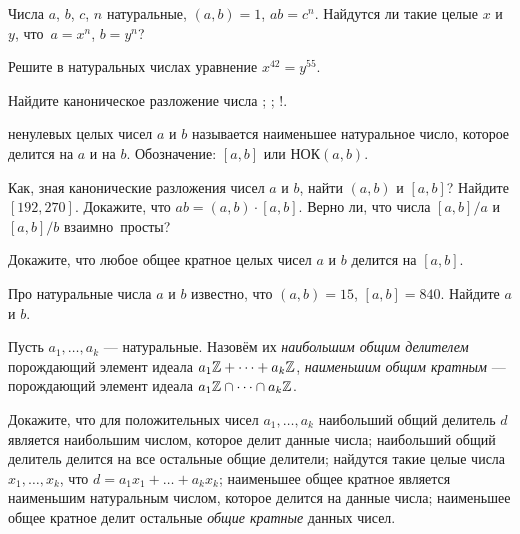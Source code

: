 \documentclass[a4paper,11pt]{article}
\begin{document}
  Числа $a$, $b$, $c$, $n$ натуральные, $(a,b)=1$, $ab=c^n$.
Найдутся ли такие целые $x$ и $y$, что~$a=x^n$, $b=y^n$?

Решите в натуральных числах уравнение $x^{42}=y^{55}$.

Найдите каноническое разложение числа 
; ; !. %

  ненулевых целых чисел $a$ и $b$
называется наименьшее натуральное число, которое делится на $a$ и на $b$.
Обозначение: $[a,b]$ или НОК$(a,b)$.


Как, зная канонические разложения %
чисел $a$ и $b$, найти
$(a,b)$ и $[a,b]$?
Найдите $[192,270]$.
Докажите, что $ab=(a,b) \cdot [a,b]$.
Верно ли, что числа $[a,b]/a$ и $[a,b]/b$ взаимно~просты?


 Докажите, что любое общее кратное
целых чисел $a$ и $b$ делится на $[a,b]$.


Про натуральные числа $a$ и $b$
известно, что $(a,b)=15$, $[a,b]=840$. Найдите $a$ и $b$.

Пусть $a_1,\dots,a_k$ --- натуральные. Назовём их \textit{наибольшим общим делителем} порождающий элемент идеала $a_1\mathbb{Z} + \dots +a_k\mathbb{Z}$, \textit{наименьшим общим кратным} --- порождающий элемент идеала $a_1\mathbb{Z} \cap \dots \cap a_k\mathbb{Z}$.

 Докажите, что для положительных чисел $a_1,\dots,a_k$
 наибольший общий делитель $d$ является наибольшим числом, которое делит данные числа;  наибольший общий делитель делится на все остальные общие делители;  найдутся такие целые числа $x_1,\dots,x_k$, что $d = a_1x_1+\dots+a_kx_k$;
 наименьшее общее кратное является наименьшим натуральным числом, которое делится на данные числа;  наименьшее общее кратное делит остальные \textit{общие кратные} данных чисел. %
\end{document}
